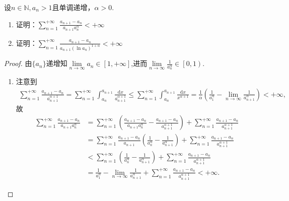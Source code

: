 \documentclass[../../main.tex]{subfiles}%
\begin{document}
\begin{example}
设\( n \in \mathbb{N}, a_n > 1 \)且单调递增，\( \alpha > 0 \).
\begin{enumerate}
\item 证明：\( \sum_{n=1}^{+\infty} \frac{a_{n+1} - a_n}{a_{n+1}a_n^\alpha} < +\infty \)

\item 证明：\( \sum_{n=1}^{+\infty} \frac{a_{n+1} - a_n}{a_{n+1}(\ln a_n)^{1+\alpha}} < +\infty \)
\end{enumerate}
\end{example}
\begin{proof}

由$\{a_n\}$递增知$\underset{n\rightarrow \infty}{\lim}a_n\in \left[ 1,+\infty \right]$,进而$\underset{n\rightarrow \infty}{\lim}\frac{1}{a_{n}^{\alpha}}\in \left[ 0,1 \right)$.
\begin{enumerate}[(1)]
\item 注意到
\begin{align*}
\sum_{n=1}^{+\infty} \frac{a_{n+1} - a_n}{a_{n+1}^{\alpha + 1}} = \sum_{n=1}^{+\infty} \int_{a_n}^{a_{n+1}} \frac{\mathrm{d}x}{a_{n+1}^{\alpha + 1}} \leqslant \sum_{n=1}^{+\infty} \int_{a_n}^{a_{n+1}} \frac{\mathrm{d}x}{x^{\alpha + 1}} = \frac{1}{\alpha} \left( \frac{1}{a_1^{\alpha}} - \lim_{n \rightarrow \infty} \frac{1}{a_{n+1}^{\alpha}} \right) < +\infty,
\end{align*}
故
\begin{align*}
\sum_{n=1}^{+\infty} \frac{a_{n+1} - a_n}{a_{n+1}a_n^{\alpha}} &= \sum_{n=1}^{+\infty} \left( \frac{a_{n+1} - a_n}{a_{n+1}a_n^{\alpha}} - \frac{a_{n+1} - a_n}{a_{n+1}^{\alpha + 1}} \right) + \sum_{n=1}^{+\infty} \frac{a_{n+1} - a_n}{a_{n+1}^{\alpha + 1}} \\
&= \sum_{n=1}^{+\infty} \frac{a_{n+1} - a_n}{a_{n+1}} \left( \frac{1}{a_n^{\alpha}} - \frac{1}{a_{n+1}^{\alpha}} \right) + \sum_{n=1}^{+\infty} \frac{a_{n+1} - a_n}{a_{n+1}^{\alpha + 1}} \\
&< \sum_{n=1}^{+\infty} \left( \frac{1}{a_n^{\alpha}} - \frac{1}{a_{n+1}^{\alpha}} \right) + \sum_{n=1}^{+\infty} \frac{a_{n+1} - a_n}{a_{n+1}^{\alpha + 1}} \\
&= \frac{1}{a_1^{\alpha}} - \lim_{n \rightarrow \infty} \frac{1}{a_{n+1}^{\alpha}} + \sum_{n=1}^{+\infty} \frac{a_{n+1} - a_n}{a_{n+1}^{\alpha + 1}} < +\infty.
\end{align*}


\end{enumerate}
\end{proof}
\end{document}
